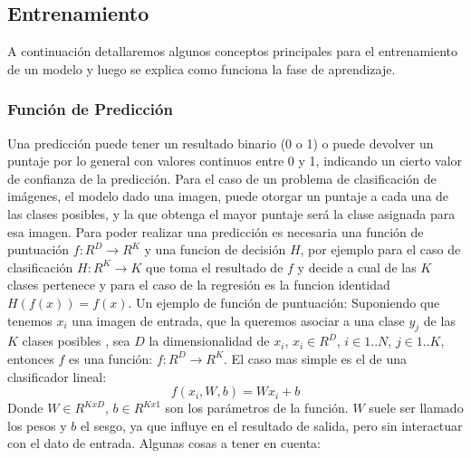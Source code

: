 \documentclass[a4paper,11pt,spanish]{book}
\begin{document}
      \subsection{Entrenamiento}
	A continuación detallaremos algunos conceptos principales para el entrenamiento de un modelo y luego se explica como funciona la fase de aprendizaje.
	\subsubsection{Función de Predicción}
	  Una predicción puede tener un resultado binario (0 o 1) o puede devolver un puntaje por lo general con valores continuos entre 0 y 1, indicando un cierto valor de confianza
	  de la predicción. Para el caso de un problema de clasificación de imágenes, el modelo dado una imagen, puede otorgar un puntaje a cada una de las clases posibles,
	  y la que obtenga el mayor puntaje será la clase asignada para esa imagen. Para poder realizar una predicción es necesaria una función de puntuación $f:R^D {\rightarrow} R^K$ 
	  y una funcion de decisión $H$, por ejemplo para el caso de clasificación $H:R^K{\rightarrow}K$ que toma el resultado de $f$ y decide a cual de las $K$ clases pertenece y para 
	  el caso de la regresión es la funcion identidad $H(f(x))=f(x)$.
	  Un ejemplo de función de puntuación:
	  Suponiendo que tenemos $x_{i}$  una imagen de entrada, que la queremos asociar a una clase $y_{j}$ de las $K$ clases posibles , sea $D$ la dimensionalidad de $x_{i}$, $x_{i} \in R^D$,
	  $i \in 1..N$, $j \in 1..K$, entonces $f$ es una función: $f:R^D {\rightarrow} R^K$. El caso mas simple es el de una clasificador lineal:\\
	  \begin{equation}
	    f(x_{i}, W, b) = W x_{i} + b
	  \end{equation}
	  Donde $W \in R^{KxD}$, $b \in R^{Kx1}$ son los parámetros de la función. $W$ suele ser llamado los pesos y $b$ el sesgo, ya que influye en el resultado de salida, pero sin
	  interactuar con el dato de entrada.
	  Algunas cosas a tener en cuenta:
\end{document}
